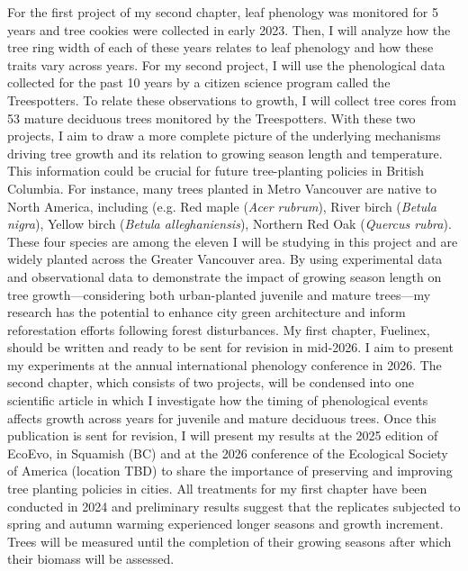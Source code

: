 \documentclass[11pt,letter]{article}
\begin{document}
For the first project of my second chapter, leaf phenology was monitored for 5 years and tree cookies were collected in early 2023. Then, I will analyze how the tree ring width of each of these years relates to leaf phenology and how these traits vary across years. For my second project, I will use the phenological data collected for the past 10 years by a citizen science program called the Treespotters. To relate these observations to growth, I will collect tree cores from 53 mature deciduous trees monitored by the Treespotters. With these two projects, I aim to draw a more complete picture of the underlying mechanisms driving tree growth and its relation to growing season length and temperature. This information could be crucial for future tree-planting policies in British Columbia. For instance, many trees planted in Metro Vancouver are native to North America, including (e.g. Red maple (\textit{Acer rubrum}), River birch (\textit{Betula nigra}), Yellow birch (\textit{Betula alleghaniensis}), Northern Red Oak (\textit{Quercus rubra}). These four species are among the eleven I will be studying in this project and are widely planted across the Greater Vancouver area. By using experimental data and observational data to demonstrate the impact of growing season length on tree growth—considering both urban-planted juvenile and mature trees—my research has the potential to enhance city green architecture and inform reforestation efforts following forest disturbances.
My first chapter, Fuelinex, should be written and ready to be sent for revision in mid-2026. I aim to present my experiments at the annual international phenology conference in 2026.
The second chapter, which consists of two projects, will be condensed into one scientific article in which I investigate how the timing of phenological events affects growth across years for juvenile and mature deciduous trees. Once this publication is sent for revision, I will present my results at the 2025 edition of EcoEvo, in Squamish (BC) and at the 2026 conference of the Ecological Society of America (location TBD) to share the importance of preserving and improving tree planting policies in cities.
All treatments for my first chapter have been conducted in 2024 and preliminary results suggest that the replicates subjected to spring and autumn warming experienced longer seasons and growth increment. Trees will be measured until the completion of their growing seasons after which their biomass will be assessed. 
\end{document}
